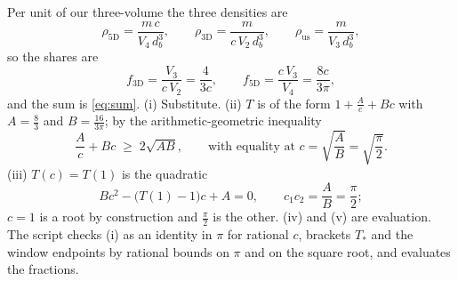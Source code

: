 Per unit of our three-volume the three densities are
\[
\rho_{5\mathrm{D}} = \frac{m\,c}{V_{4}\,d_{b}^{3}}, \qquad
\rho_{3\mathrm{D}} = \frac{m}{c\,V_{2}\,d_{b}^{3}}, \qquad
\rho_{\mathrm{us}} = \frac{m}{V_{3}\,d_{b}^{3}},
\]
so the shares are
\[
f_{3\mathrm{D}} = \frac{V_{3}}{c\,V_{2}} = \frac{4}{3c}, \qquad f_{5\mathrm{D}} = \frac{c\,V_{3}}{V_{4}} = \frac{8c}{3\pi},
\]
and the sum is \eqref{eq:sum}. (i) Substitute. (ii) $T$ is of the form $1 + \frac{A}{c} + Bc$ with $A = \frac{8}{3}$ and $B = \frac{16}{3\pi}$; by the arithmetic-geometric inequality
\[
\frac{A}{c} + Bc \;\geq\; 2\sqrt{AB}, \qquad \text{with equality at } c = \sqrt{\frac{A}{B}} = \sqrt{\frac{\pi}{2}} .
\]
(iii) $T(c) = T(1)$ is the quadratic
\[
Bc^{2} - \bigl(T(1) - 1\bigr)c + A = 0, \qquad c_{1}c_{2} = \frac{A}{B} = \frac{\pi}{2};
\]
$c = 1$ is a root by construction and $\frac{\pi}{2}$ is the other. (iv) and (v) are evaluation. The script checks (i) as an identity in $\pi$ for rational $c$, brackets $T_{\ast}$ and the window endpoints by rational bounds on $\pi$ and on the square root, and evaluates the fractions.
